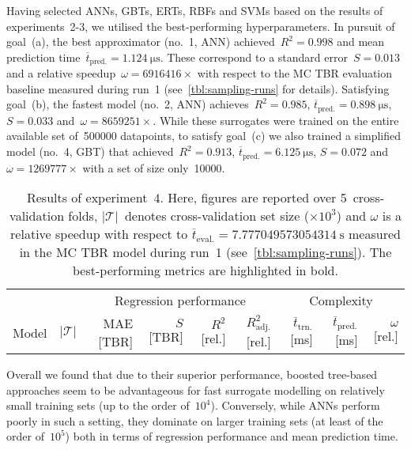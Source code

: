 Having selected ANNs, GBTs, ERTs, RBFs and SVMs based on the results of
experiments~2-3, we utilised the best-performing hyperparameters.
In pursuit of goal~(a), the best approximator (no.~1,
ANN) achieved~$R^2=\num{0.998}$ and mean prediction
time~$\overline{t}_{\text{pred.}}=\SI{1.124}{\micro\second}$. These correspond
to a standard error~$S=\num{0.013}$ and a relative speedup~$\omega=\num{6916416} \times$
with respect to the MC TBR evaluation baseline measured during run~1
(see~\cref{tbl:sampling-runs} for details). Satisfying
goal~(b), the fastest model (no.~2, ANN) achieves~$R^2=\num{0.985}$,
$\overline{t}_{\text{pred.}}=\SI{0.898}{\micro\second}$, $S=\num{0.033}$
and~$\omega=\num{8659251} \times$.
While these surrogates
were trained on the entire available set of~\num{500000} datapoints, to satisfy goal~(c) we also trained a simplified model (no.~4, GBT)
that achieved~$R^2=\num{0.913}$,
$\overline{t}_{\text{pred.}}=\SI{6.125}{\micro\second}$, $S=\num{0.072}$ and $\omega=\num{1269777} \times$
with a set of size only~\num{10000}.

\begin{table}[h]
	\centering
	\setlength\tabcolsep{2pt}
	{\scriptsize
		\begin{tabular}{lrrrrrrrr}
		\toprule
		{} & {} & \multicolumn{4}{c}{Regression performance} &
		\multicolumn{3}{c}{Complexity}\\
		\cmidrule(lr){3-6}
		\cmidrule(lr){7-9}
		Model & $|\mathcal{T}|$ & MAE [TBR] & $S$ [TBR] & $R^2$ [rel.] & $R^2_{\text{adj.}}$ [rel.]
						& $\overline{t}_{\text{trn.}}$ [\si{\milli\second}] &
		$\overline{t}_{\text{pred.}}$ [\si{\milli\second}] & $\omega$ [rel.]\\
		\midrule
		
		\bottomrule
		\end{tabular}
	}
	\caption{Results of experiment~4. Here, figures are reported over 5~cross-validation folds,
		$|\mathcal{T}|$~denotes cross-validation set size ($\times 10^3$)
		and $\omega$ is a relative speedup with respect to
		$\overline{t}_{\text{eval.}}=\SI{7.777049573054314}{\second}$
		measured in the MC TBR model during run~1 (see~\cref{tbl:sampling-runs}).
		The best-performing metrics are highlighted in bold.}
	\label{tbl:exp4-detailed-results}
\end{table}

Overall we found that due to their superior performance, boosted tree-based
approaches seem to be advantageous for fast surrogate modelling on relatively small training
sets (up to the order of~$10^4$). Conversely, while ANNs perform
poorly in such a setting, they dominate on larger training sets (at least of the
order of~$10^5$) both in terms of regression performance and mean prediction time.

